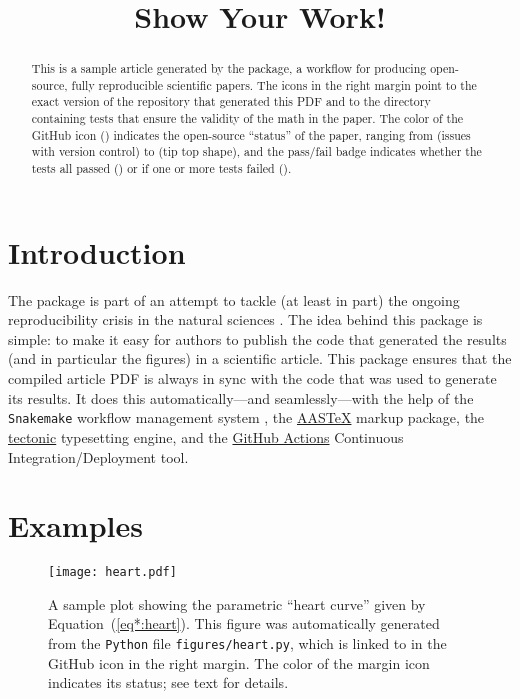 \documentclass[modern]{aastex62}
\begin{document}
\title{Show Your Work!}

\author[\myORCID]{\myName}
\email{\myEmail}
\affil{\myAffil}

\begin{abstract}
    This is a sample article generated by the \showyourwork package, a workflow for producing open-source, fully reproducible scientific papers.
    The icons in the right margin point to the exact version of the repository that generated this PDF and to the directory containing tests that ensure the validity of the math in the paper.
    The color of the GitHub icon (\GitHubIcon) indicates the open-source ``status'' of the paper, ranging from \GitHubIconRed (issues with version control) to \GitHubIconBlue (tip top shape), and the pass/fail badge indicates whether the tests all passed (\TestPassIcon) or if one or more tests failed (\TestFailIcon).
\end{abstract}

\section{Introduction}

The \showyourwork package is part of an attempt to tackle (at least in part) the ongoing reproducibility crisis in the natural sciences \citep[see, e.g.,][]{Baker2016}.
The idea behind this package is simple: to make it easy for authors to publish the code that generated the results (and in particular the figures) in a scientific article.
This package ensures that the compiled article PDF is always in sync with the code that was used to generate its results.
It does this automatically---and seamlessly---with the help of the \texttt{Snakemake} workflow management system \citep{Molder2021}, the \href{https://journals.aas.org/aastex-package-for-manuscript-preparation/}{AASTeX} markup package, the \href{https://github.com/tectonic-typesetting/tectonic}{tectonic} typesetting engine, and the \href{https://github.com/features/actions}{GitHub Actions} Continuous Integration/Deployment tool.

\section{Examples}

\begin{figure}[t!]
    \begin{centering}
        \texttt{[image: heart.pdf]}
        \caption{
            A sample plot showing the parametric ``heart curve'' given by Equation~(\ref{eq*:heart}).
            This figure was automatically generated from the \texttt{Python} file \texttt{figures/heart.py}, which is linked to in the GitHub icon in the right margin.
            The color of the margin icon indicates its status; see text for details.
        }
        \label{fig:heart}
    \end{centering}
\end{figure}
\end{document}
